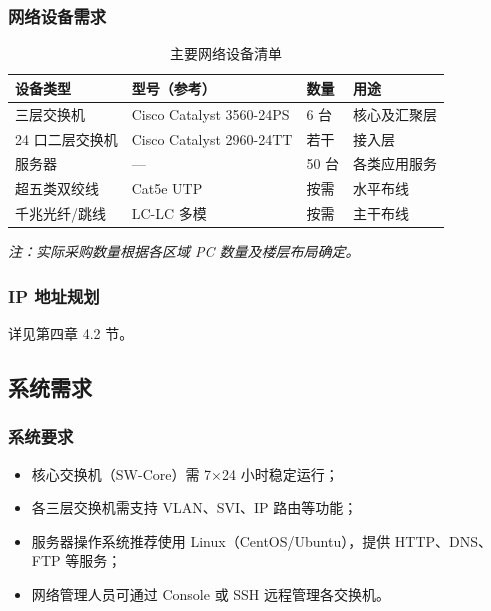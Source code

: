 \documentclass[12pt,a4paper]{ctexart}
\begin{document}
\subsubsection{网络设备需求}

\begin{table}[H]
\centering
\caption{主要网络设备清单}
\begin{tabular}{L{3.5cm}L{4.5cm}C{1.5cm}L{3.5cm}}
\toprule
\textbf{设备类型} & \textbf{型号（参考）} & \textbf{数量} & \textbf{用途} \\
\midrule
三层交换机       & Cisco Catalyst 3560-24PS  & 6 台  & 核心及汇聚层 \\
24 口二层交换机  & Cisco Catalyst 2960-24TT  & 若干  & 接入层 \\
服务器           & ---                       & 50 台 & 各类应用服务 \\
超五类双绞线     & Cat5e UTP                 & 按需  & 水平布线 \\
千兆光纤/跳线    & LC-LC 多模                & 按需  & 主干布线 \\
\bottomrule
\end{tabular}

\smallskip
\footnotesize\textit{注：实际采购数量根据各区域 PC 数量及楼层布局确定。}
\end{table}

\subsubsection{IP 地址规划}

详见第四章 4.2 节。

\subsection{系统需求}

\subsubsection{系统要求}

\begin{itemize}
  \item 核心交换机（SW-Core）需 7×24 小时稳定运行；
  \item 各三层交换机需支持 VLAN、SVI、IP 路由等功能；
  \item 服务器操作系统推荐使用 Linux（CentOS/Ubuntu），提供 HTTP、DNS、FTP 等服务；
  \item 网络管理人员可通过 Console 或 SSH 远程管理各交换机。
\end{itemize}
\end{document}
